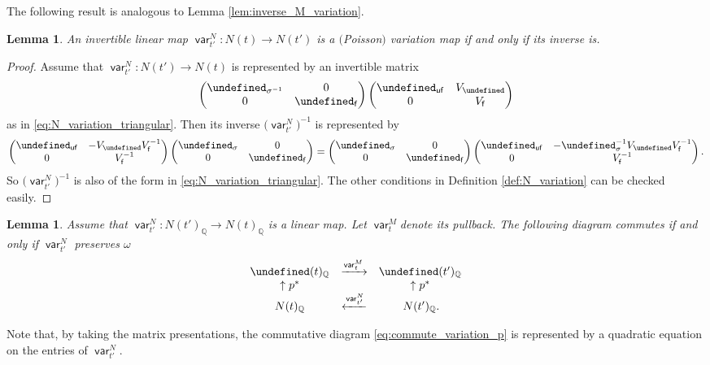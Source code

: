 \documentclass[10pt,a4paper]{amsart}
\newcommand{\Q}{\mathbb{Q}}
\newcommand{\opname}[1]{\operatorname{\mathsf{#1}}}
\newcommand{\var}{\opname{var}}
\newcommand{\fv}{\opname{f}}
\newcommand{\ufv}{\opname{uf}}
\let\Mc\undefined
\let\Id\undefined
\let\trans\undefined
\let\high\undefined
\newcommand{\Mc}{M^\circ}
\newcommand{\Id}{{\opname{Id}}}
\newcommand{\trans}{\opname{P}}
\newcommand{\high}{\opname{\ufv,\fv}}
\numberwithin{equation}{section}
\newtheorem{Lemma}[Theorem]{Lemma}
\begin{document}
The following result is analogous to Lemma \ref{lem:inverse_M_variation}.

\begin{Lemma}\label{lem:inverse_N_variation}
An invertible linear map $\var_{t'}^{N}\colon N(t)\rightarrow N(t')$ is
a $($Poisson$)$ variation map if and only if its inverse is.
\end{Lemma}

\begin{proof}
Assume that $\var_{t'}^{N}\colon N(t')\rightarrow N(t)$ is represented
by an invertible matrix \[\begin{pmatrix}
\trans_{\sigma^{-1}} & 0\\
0 & \Id_{\fv}
\end{pmatrix}\begin{pmatrix}
\Id_{\ufv} & V_{\high}\\
0 & V_{\fv}
\end{pmatrix}\] as in \ref{eq:N_variation_triangular}. Then its inverse $\bigl(\var_{t'}^{N}\bigr)^{-1}$
is represented by \[\begin{pmatrix}
\Id_{\ufv} & -V_{\high}V_{\fv}^{-1}\\
0 & V_{\fv}^{-1}
\end{pmatrix}\begin{pmatrix}
\trans_{\sigma} & 0\\
0 & \Id_{\fv}
\end{pmatrix}=\begin{pmatrix}
\trans_{\sigma} & 0\\
0 & \Id_{\fv}
\end{pmatrix}\begin{pmatrix}
\Id_{\ufv} & -\trans_{\sigma}^{-1}V_{\high}V_{\fv}^{-1}\\
0 & V_{\fv}^{-1}
\end{pmatrix}.\] So $\bigl(\var_{t'}^{N}\bigr)^{-1}$ is also of the form in \eqref{eq:N_variation_triangular}.
The other conditions in Definition \ref{def:N_variation} can be checked
easily.
\end{proof}

\begin{Lemma}\label{lem:commute_variation_p}
Assume that $\var_{t'}^{N}\colon N(t')_{\Q}\rightarrow N(t)_{\Q}$ is a
linear map. Let $\var_{t}^{M}$denote its pullback. The following
diagram commutes if and only if $\var_{t'}^{N}$ preserves $\omega$
\begin{align}
\begin{array}{ccc}
\Mc(t)_{\Q} & \xrightarrow{\var_{t}^{M}} & \Mc(t')_{\Q}\\
\uparrow p^{*} & & \uparrow p^{*}\\
N(t)_{\Q} & \xleftarrow{\var_{t'}^{N}} & \,N(t')_{\Q}.
\end{array}\label{eq:commute_variation_p}
\end{align}
\end{Lemma}
Note that, by taking the matrix presentations, the commutative diagram \eqref{eq:commute_variation_p} is represented by a quadratic equation on the entries of $\var_{t'}^N$.
\end{document}
